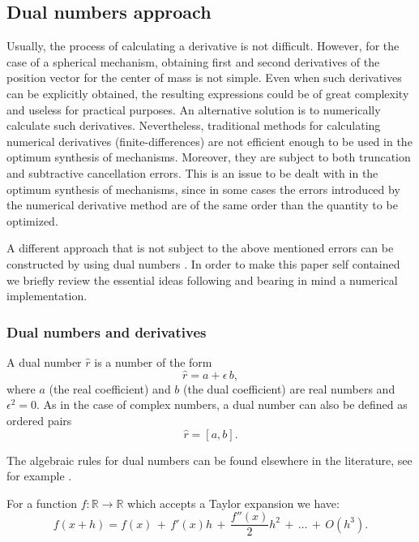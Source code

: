 \documentclass[11pt]{article}
\begin{document}
\subsection{Dual numbers approach}\label{subsec2.2}
Usually, the process of calculating a derivative is not difficult. 
However, for the case of a spherical mechanism, obtaining first and 
second derivatives of the position vector for the center of mass is not 
simple. Even when such derivatives can be explicitly obtained, the 
resulting expressions could be of great complexity and useless for 
practical purposes. An alternative solution is to numerically calculate 
such derivatives. Nevertheless, traditional methods for calculating 
numerical derivatives (finite-differences) are not efficient enough to 
be used in the optimum synthesis of mechanisms. Moreover, they are 
subject to both truncation and subtractive cancellation errors. This is 
an issue to be dealt with in the optimum synthesis of mechanisms, since 
in some cases the errors introduced by the numerical derivative method 
are of the same order than the quantity to be optimized.

A different approach that is not subject to the above mentioned errors 
can be constructed by using  dual numbers \cite{Gu1987,Cheng1994,
Penunuri2013}. In order to make this paper self contained we briefly 
review the essential ideas following \cite{Penunuri2013} and bearing in 
mind a numerical implementation. 

\subsubsection*{Dual numbers and derivatives}
A dual number $\hat{r}$ is a number of the form 
\begin{equation}
\hat{r}= a +\epsilon \,b,
\end{equation}
where $a$ (the real coefficient) and $b$ (the dual coefficient) are real 
numbers and $\epsilon^2=0$. As in the case of complex numbers, a dual 
number can also be defined as ordered pairs
\begin{equation}\label{xDual}
\hat{r}=[a,b].
\end{equation}
 
The algebraic rules for dual numbers can be found elsewhere in the 
literature, see for example  \cite{Clif1873, Brodsky1999,Ettore2008}.

For a function $f:\mathbb{R}\to \mathbb{R}$ which accepts a Taylor 
expansion we have:
\begin{equation} \label{TayS}
f(x+h)=f(x) \, + \, f'(x) h \, + \, \frac{f''(x)}{2} h^2 \,+\, \dots \,
+\, O(h^3).
\end{equation}
\end{document}
